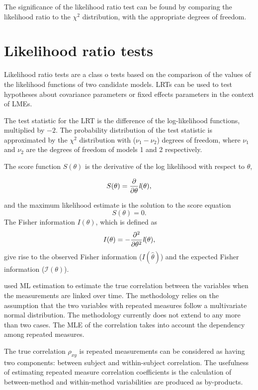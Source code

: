 \documentclass[12pt, a4paper]{report}
\theoremstyle{plain}
\theoremstyle{definition}
\theoremstyle{remark}
\begin{document}
The significance of the likelihood ratio test can be found by comparing the likelihood ratio to the $\chi^2$ distribution, with the appropriate degrees of freedom.



\section{Likelihood ratio tests}
Likelihood ratio tests are  a class o tests based on the
comparison of the values of the likelihood functions of two
candidate models. LRTs can be used to test hypotheses about
covariance parameters or fixed effects parameters in the context
of LMEs.

The test statistic for the LRT is the difference of the log-likelihood functions, multiplied by $-2$.
The probability distribution of the test statistic is approximated by the $\chi^2$ distribution with ($\nu_{1} - \nu_{2}$) degrees of freedom, where $\nu_{1}$  and $\nu_{2}$ are the degrees of freedom of models 1 and 2 respectively.

The score function $S(\theta)$ is the derivative of the log likelihood with respect to $\theta$,

\[
S(\theta) = \frac{\partial}{\partial \theta}\emph{l}(\theta),
\]

and the maximum likelihood estimate is the solution to the score equation
\[
S(\theta) = 0.
\]
The Fisher information $I(\theta)$, which is defined as
\[
I(\theta) = - \frac{\partial^2}{\partial \theta^2}\emph{l}(\theta),
\]
give rise to the observed Fisher information ($I(\hat{\theta})$) and the expected Fisher information ($\mathcal{I}(\theta)$).



\citet{Lam} used ML estimation to estimate the true correlation between the variables when
the measurements are linked over time. The methodology relies on the assumption that the two variables with repeated measures follow a multivariate normal distribution. The methodology currently does not extend to any more than two cases. The MLE of the correlation takes into account the dependency among repeated measures.

The true correlation $\rho_{xy}$ is repeated measurements can be considered as having two components: between subject and within-subject correlation. The usefulness of estimating repeated measure correlation coefficients is the calculation of between-method and within-method variabilities are produced as by-products.
\end{document}
